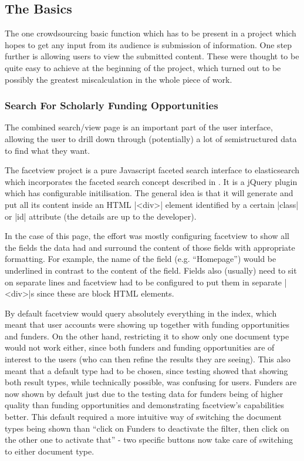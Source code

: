 \subsection{The Basics}
\label{impl-hard-basics}

The one crowdsourcing basic function which has to be present in a project which hopes to get any input from its audience is submission of information. One step further is allowing users to view the submitted content. These were thought to be quite easy to achieve at the beginning of the project, which turned out to be possibly the greatest miscalculation in the whole piece of work.

\subsubsection{Search For Scholarly Funding Opportunities}
\label{impl-facetview}
\label{impl-search}
The combined search/view page is an important part of the user interface, allowing the user to drill down through (potentially) a lot of semistructured data to find what they want.

The facetview project is a pure Javascript faceted search interface to elasticsearch which incorporates the faceted search concept described in . It is a jQuery plugin which has configurable initilisation. The general idea is that it will generate and put all its content inside an HTML |<div>| element identified by a certain |class| or |id| attribute (the details are up to the developer).

In the case of this page, the effort was mostly configuring facetview to show all the fields the data had and surround the content of those fields with appropriate formatting. For example, the name of the field (e.g. ``Homepage'') would be underlined in contrast to the content of the field. Fields also (usually) need to sit on separate lines and facetview had to be configured to put them in separate |<div>|s since these are block HTML elements.

By default facetview would query absolutely everything in the index, which meant that user accounts were showing up together with funding opportunities and funders. On the other hand, restricting it to show only one document type would not work either, since both funders and funding opportunities are of interest to the users (who can then refine the results they are seeing). This also meant that a default type had to be chosen, since testing showed that showing both result types, while technically possible, was confusing for users. Funders are now shown by default just due to the testing data for funders being of higher quality than funding opportunities and demonstrating facetview's capabilities better. This default required a more intuitive way of switching the document types being shown than ``click on Funders to deactivate the filter, then click on the other one to activate that'' - two specific buttons now take care of switching to either document type.

